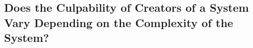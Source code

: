 \subsection{Does the Culpability of Creators of a System Vary Depending on the Complexity of the System?}
\label{sec:-culpability}


